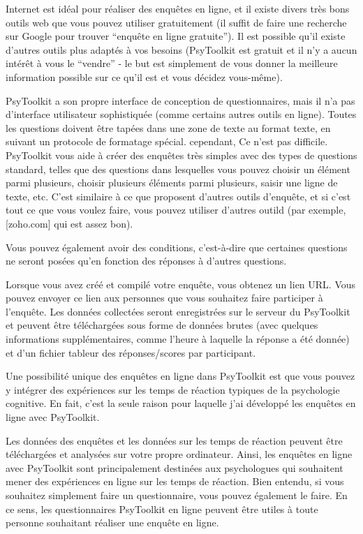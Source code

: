 \documentclass[
]{book}
\begin{document}
Internet est idéal pour réaliser des enquêtes en ligne, et il existe
divers très bons outils web que vous pouvez utiliser gratuitement (il
suffit de faire une recherche sur Google pour trouver ``enquête en ligne
gratuite''). Il est possible qu'il existe d'autres outils plus adaptés à
vos besoins (PsyToolkit est gratuit et il n'y a aucun intérêt à vous le
``vendre'' - le but est simplement de vous donner la meilleure
information possible sur ce qu'il est et vous décidez vous-même).

PsyToolkit a son propre interface de conception de questionnaires, mais
il n'a pas d'interface utilisateur sophistiquée (comme certains autres
outils en ligne). Toutes les questions doivent être tapées dans une zone
de texte au format texte, en suivant un protocole de formatage spécial.
cependant, Ce n'est pas difficile. PsyToolkit vous aide à créer des
enquêtes très simples avec des types de questions standard, telles que
des questions dans lesquelles vous pouvez choisir un élément parmi
plusieurs, choisir plusieurs éléments parmi plusieurs, saisir une ligne
de texte, etc. C'est similaire à ce que proposent d'autres outils
d'enquête, et si c'est tout ce que vous voulez faire, vous pouvez
utiliser d'autres outild (par exemple, {[}zoho.com{]} qui est assez
bon).

Vous pouvez également avoir des conditions, c'est-à-dire que certaines
questions ne seront posées qu'en fonction des réponses à d'autres
questions.

Lorsque vous avez créé et compilé votre enquête, vous obtenez un lien
URL. Vous pouvez envoyer ce lien aux personnes que vous souhaitez faire
participer à l'enquête. Les données collectées seront enregistrées sur
le serveur du PsyToolkit et peuvent être téléchargées sous forme de
données brutes (avec quelques informations supplémentaires, comme
l'heure à laquelle la réponse a été donnée) et d'un fichier tableur des
réponses/scores par participant.

Une possibilité unique des enquêtes en ligne dans PsyToolkit est que
vous pouvez y intégrer des expériences sur les temps de réaction
typiques de la psychologie cognitive. En fait, c'est la seule raison
pour laquelle j'ai développé les enquêtes en ligne avec PsyToolkit.

Les données des enquêtes et les données sur les temps de réaction
peuvent être téléchargées et analysées sur votre propre ordinateur.
Ainsi, les enquêtes en ligne avec PsyToolkit sont principalement
destinées aux psychologues qui souhaitent mener des expériences en ligne
sur les temps de réaction. Bien entendu, si vous souhaitez simplement
faire un questionnaire, vous pouvez également le faire. En ce sens, les
questionnaires PsyToolkit en ligne peuvent être utiles à toute personne
souhaitant réaliser une enquête en ligne.
\end{document}
